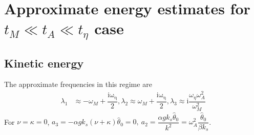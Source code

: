 \documentclass[12pt,psfig]{article}
\begin{document}
\section{Approximate energy estimates for $t_M\ll t_A\ll t_\eta$ case}
\subsection{Kinetic energy}
The approximate frequencies in this regime are
\begin{align*}
\lambda_1&\approx -\omega_M+\dfrac{\mathrm{i\omega_\eta}}{2},
\lambda_2\approx \omega_M+\dfrac{\mathrm{i\omega_\eta}}{2},\lambda_3\approx \mathrm{i} \dfrac{\omega_\eta\omega_A^2}{\omega_M^2}
\end{align*}
For $\nu=\kappa=0$, $a_3=-\alpha g k_s(\nu+\kappa)\hat{\theta}_0=0, \ a_2=\dfrac{\alpha g k_s \hat{\theta}_0}{k^2}=\omega_A^2\dfrac{\hat{\theta}_0}{\beta k_s}$. 
\end{document}
